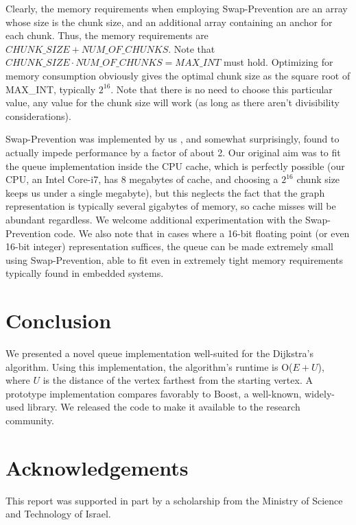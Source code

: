 \documentclass[conference,10pt,twocolumn]{IEEEtran}
\begin{document}
Clearly, the memory requirements when employing Swap-Prevention are an array whose size is the chunk size, and an additional array containing an anchor for each chunk. Thus, the memory requirements are $CHUNK\_SIZE + NUM\_OF\_CHUNKS$. Note that $CHUNK\_SIZE \cdot NUM\_OF\_CHUNKS = MAX\_INT$ must hold. Optimizing for memory consumption obviously gives the optimal chunk size as the square root of MAX\_INT, typically $2^{16}$. Note that there is no need to choose this particular value, any value for the chunk size will work (as long as there aren't divisibility considerations).

Swap-Prevention was implemented by us \cite{Swap-Prevention-Commit}, and somewhat surprisingly, found to actually impede performance by a factor of about 2. Our original aim was to fit the queue implementation inside the CPU cache, which is perfectly possible (our CPU, an Intel Core-i7, has 8 megabytes of cache, and choosing a $2^{16}$ chunk size keeps us under a single megabyte), but this neglects the fact that the graph representation is typically several gigabytes of memory, so cache misses will be abundant regardless. We welcome additional experimentation with the Swap-Prevention code. We also note that in cases where a 16-bit floating point (or even 16-bit integer) representation suffices, the queue can be made extremely small using Swap-Prevention, able to fit even in extremely tight memory requirements typically found in embedded systems. 

\section{Conclusion} \label{sec:cncld}
We presented a novel queue implementation well-suited for the Dijkstra's algorithm. Using this implementation, the algorithm's runtime is O($E + U$), where $U$ is the distance of the vertex farthest from the starting vertex. A prototype implementation compares favorably to Boost, a well-known, widely-used library. We released the code to make it available to the research community.



\section*{Acknowledgements}
This report was supported in part by a scholarship from the Ministry of Science and Technology of Israel.



\end{document}
